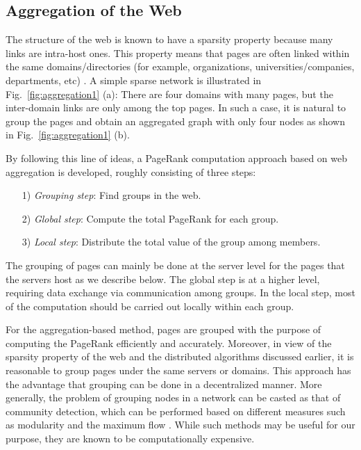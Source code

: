 \documentclass[11pt,draftcls,onecolumn]{IEEEtran}
\begin{document}
\subsection*{Aggregation of the Web}

The structure of the web is known to have a sparsity property because
many links are intra-host ones. This property means that pages are often linked 
within the same domains/directories (for example, organizations, universities/companies, 
departments, etc) \cite{LanMey:06,BroLem_infret:06}. 
A simple sparse network is illustrated in Fig.~\ref{fig:aggregation1} (a):
There are four domains with many pages, but the inter-domain links are only 
among the top pages.
In such a case, it is natural to group the pages and obtain an aggregated
graph with only four nodes as shown in Fig.~\ref{fig:aggregation1} (b).

By following this line of ideas, a PageRank computation approach
based on web aggregation is developed, roughly consisting of three steps: 
\begin{enumerate}
\item[1)] \textit{Grouping step}: Find groups in the web.
\item[2)] \textit{Global step}: Compute the total PageRank for each group.
\item[3)] \textit{Local step}: Distribute the total value of the group among members.
\end{enumerate}
The grouping of pages can mainly be done at the server level for the pages that
the servers host as we describe below.
The global step is at a higher level, requiring data exchange via communication among groups. 
In the local step, most of the computation should be carried out locally
within each group. 

For the aggregation-based method, pages are grouped 
with the purpose of computing the PageRank efficiently and accurately. 
Moreover, in view of the sparsity property of the web and the distributed algorithms 
discussed earlier, 
it is reasonable to group pages under the same servers or domains. This approach
has the advantage that grouping can be done in a decentralized manner.
More generally, the problem of grouping nodes in a network can be casted
as that of community detection, which can be performed based on different
measures such as modularity \cite{Newman:06,ExpEvaBlo:11} 
and the maximum flow \cite{FlaLawGil:02}. While such methods may be useful
for our purpose, they are known to be computationally expensive.
\end{document}
